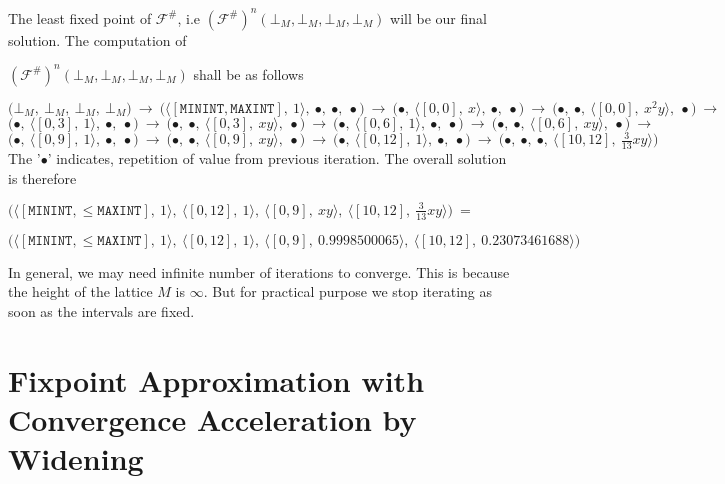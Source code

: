 \documentclass[final,3p, review, times]{util/elsarticle}
\begin{document}
The least fixed point of $\mathcal{F^\#}$, i.e $(\mathcal{F^\#})^n(\bot_M, \bot_M, \bot_M, \bot_M)$ will be our final solution. The computation of

\noindent$(\mathcal{F^\#})^n(\bot_M, \bot_M, \bot_M, \bot_M)$ shall be as follows

\noindent
$
\bigg(\bot_M,\ \bot_M,\ \bot_M,\ \bot_M\bigg)\ \to\ 
\bigg(\big\langle[\mathtt{MININT},\mathtt{MAXINT}],\ 1\big\rangle,\ \bullet,\ \bullet,\ \bullet\bigg)\ \to\ 
\bigg(\bullet,\ \big\langle[0,0],\ x\big\rangle,\ \bullet,\ \bullet\bigg)\ \to\ 
\bigg(\bullet,\ \bullet,\ \big\langle[0,0],\ x^2y\big\rangle,\ \bullet\bigg)\ \to
$\\
$
\bigg(\bullet,\ \big\langle[0,3],\ 1\big\rangle,\ \bullet,\ \bullet\bigg)\ \to\ 
\bigg(\bullet,\ \bullet,\ \big\langle[0,3],\ xy\big\rangle,\ \bullet\bigg)\ \to\ 
\bigg(\bullet,\ \big\langle[0,6],\ 1\big\rangle,\ \bullet,\ \bullet\bigg)\ \to\ 
\bigg(\bullet,\ \bullet,\ \big\langle[0,6],\ xy\big\rangle,\ \bullet\bigg)\ \to
$\\
$
\bigg(\bullet,\ \big\langle[0,9],\ 1\big\rangle,\ \bullet,\ \bullet\bigg)\ \to\ \bigg(\bullet,\ \bullet,\ \big\langle[0,9],\ xy\big\rangle,\ \bullet\bigg)\ \to\ \bigg(\bullet,\ \big\langle[0,12],\ 1\big\rangle,\ \bullet,\ \bullet\bigg)\ \to\ \bigg(\bullet,\ \bullet,\ \bullet,\ \big\langle[10,12],\ \frac{3}{13}xy\big\rangle\bigg)
$\\

The '$\bullet$' indicates, repetition of value from previous iteration. The overall solution is therefore

\noindent$\bigg(\Big\langle[\mathtt{MININT},\leq\mathtt{MAXINT}],\ 1\Big\rangle,\ \Big\langle[0,12],\ 1\Big\rangle,\ \Big\langle[0,9],\ xy\Big\rangle,\ \Big\langle[10,12],\ \frac{3}{13}xy\Big\rangle\bigg)\ =$

\noindent$\bigg(\Big\langle[\mathtt{MININT},\leq\mathtt{MAXINT}],\ 1\Big\rangle,\ \Big\langle[0,12],\ 1\Big\rangle,\ \Big\langle[0,9],\ 0.9998500065\Big\rangle,\ \Big\langle[10,12],\ 0.23073461688\Big\rangle\bigg)$

In general, we may need infinite number of iterations to converge. This is because the height of the lattice $M$ is $\infty$. But for practical purpose we stop iterating as soon as the intervals are fixed.

\section{Fixpoint Approximation with Convergence Acceleration by Widening}
 
\end{document}
